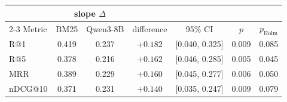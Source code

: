 \begin{tabular}{l cc c c cc}
\toprule
& \multicolumn{2}{c}{slope $\Delta$} & & & & \\
\cmidrule(lr){2-3}
Metric & BM25 & Qwen3-8B & difference & 95\% CI & $p$ & $p_{\mathrm{Holm}}$ \\
\midrule
R@1 & 0.419 & 0.237 & $+0.182$ & [0.040, 0.325] & 0.009 & 0.085 \\
R@5 & 0.378 & 0.216 & $+0.162$ & [0.046, 0.285] & 0.005 & 0.045 \\
MRR & 0.389 & 0.229 & $+0.160$ & [0.045, 0.277] & 0.006 & 0.050 \\
nDCG@10 & 0.371 & 0.231 & $+0.140$ & [0.035, 0.247] & 0.009 & 0.079 \\
\bottomrule
\end{tabular}
